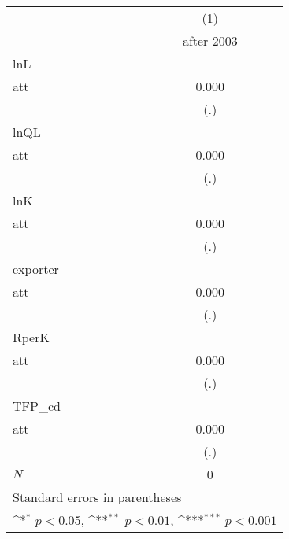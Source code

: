 {
\def\sym#1{\ifmmode^{#1}\else\(^{#1}\)\fi}
\begin{tabular}{l*{1}{c}}
\hline\hline
            &\multicolumn{1}{c}{(1)}\\
            &\multicolumn{1}{c}{after 2003 }\\
\hline
lnL         &                     \\
att         &       0.000         \\
            &         (.)         \\
\hline
lnQL        &                     \\
att         &       0.000         \\
            &         (.)         \\
\hline
lnK         &                     \\
att         &       0.000         \\
            &         (.)         \\
\hline
exporter    &                     \\
att         &       0.000         \\
            &         (.)         \\
\hline
RperK       &                     \\
att         &       0.000         \\
            &         (.)         \\
\hline
TFP\_cd      &                     \\
att         &       0.000         \\
            &         (.)         \\
\hline
\(N\)       &           0         \\
\hline\hline
\multicolumn{2}{l}{\footnotesize Standard errors in parentheses}\\
\multicolumn{2}{l}{\footnotesize \sym{*} \(p<0.05\), \sym{**} \(p<0.01\), \sym{***} \(p<0.001\)}\\
\end{tabular}
}
